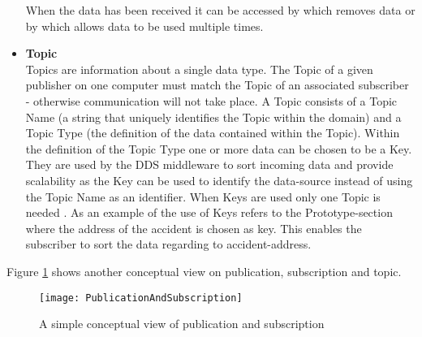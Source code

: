 \documentclass[Main]{subfiles}
\begin{document}
\begin{itemize}
When the data has been received it can be accessed by  which removes data or by  which allows data to be used multiple times.

  \item \textbf{Topic}
  \\
  Topics are information about a single data type. 
  The Topic of a given publisher on one computer must match the Topic of an associated subscriber - otherwise communication will not take place. 
  A Topic consists of a Topic Name (a string that uniquely identifies the Topic within the domain) and a Topic Type (the definition of the data contained within the Topic). 
  Within the definition of the Topic Type one or more data can be chosen to be a Key. 
  They are used by the DDS middleware to sort incoming data and provide scalability as the Key can be used to identify the data-source instead of using the Topic Name as an identifier. 
  When Keys are used only one Topic is needed \cite{RTI} \cite{opendds} \cite{DDS-slides}. 
  As an example of the use of Keys refers to the Prototype-section where the address of the accident is chosen as key. 
  This enables the subscriber to sort the data regarding to accident-address.
\end{itemize}

Figure \ref{fig:pubSub} shows another conceptual view on publication, subscription and topic. 

\begin{figure}[H]
\centering
\texttt{[image: PublicationAndSubscription]}
\caption{A simple conceptual view of publication and subscription \cite{opendds}}
\label{fig:pubSub}
\end{figure}
\end{document}
